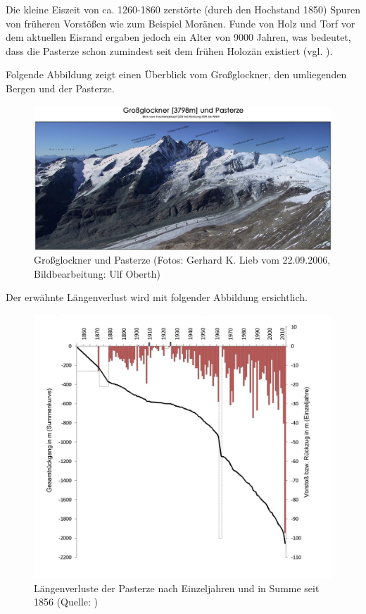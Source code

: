 \documentclass[12pt,a4paper]{article}
\begin{document}
Die kleine Eiszeit von ca. 1260-1860 zerstörte (durch den Hochstand 1850) Spuren von früheren Vorstößen wie zum Beispiel Moränen. Funde von Holz und Torf vor dem aktuellen Eisrand ergaben jedoch ein Alter von 9000 Jahren, was bedeutet, dass die Pasterze schon zumindest seit dem frühen Holozän existiert (vgl. \cite[24]{Pasterze}).

Folgende Abbildung zeigt einen Überblick vom Großglockner, den umliegenden Bergen und der Pasterze. 
\begin{figure}[H]
\centering
\includegraphics[width=1\textwidth]{pictures/Pasterze_Beschriftung_bw.jpg}
\caption[Großglockner und Pasterze]{Großglockner und Pasterze (Fotos: Gerhard K. Lieb vom 22.09.2006, Bildbearbeitung: Ulf Oberth)}
\label{fig:Grossglockner und Pasterze}
\end{figure}
\pagebreak
Der erwähnte Längenverlust wird mit folgender Abbildung ersichtlich.

\begin{figure}[H]
\centering
\includegraphics[width=1\textwidth]{pictures/pasterze_laengenaenderung.jpg}
\caption[Längenverluste der Pasterze nach Einzeljahren und in Summe seit 1856]{Längenverluste der Pasterze nach Einzeljahren und in Summe seit 1856  (Quelle:  \cite{LaengenaenderungPasterze})}
\label{fig:Längenverluste der Pasterze}
\end{figure}
\end{document}

